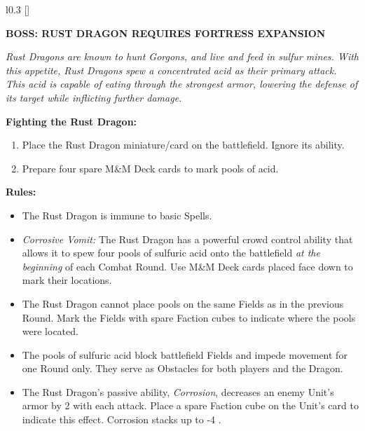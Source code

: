 \begin{wrapfigure}{l}{0.3\textwidth}
  \raisebox{0pt}[\dimexpr{}\baselineskip\relax]{}
\end{wrapfigure}
{
  \textbf{\MakeUppercase{Boss: Rust Dragon {\scriptsize Requires Fortress Expansion}}}

  \medskip

  \textit{Rust Dragons are known to hunt Gorgons, and live and feed in sulfur mines.
    With this appetite, Rust Dragons spew a concentrated acid as their primary attack.
    This acid is capable of eating through the strongest armor, lowering the defense of its target while inflicting further damage.
  }

  \medskip

  \textbf{Fighting the Rust Dragon:}
  \begin{enumerate}
    \item Place the Rust Dragon miniature/card on the battlefield.
      Ignore its ability.
    \item Prepare four spare M\&M Deck cards to mark pools of acid.
  \end{enumerate}

  \medskip

  \textbf{Rules:}
  \begin{itemize}
    \item The Rust Dragon is immune to basic Spells.
    \item \textit{Corrosive Vomit:} The Rust Dragon has a powerful crowd control ability that allows it to spew four pools of sulfuric acid onto the battlefield \textit{at the beginning} of each Combat Round.
      Use M\&M Deck cards placed face down to mark their locations.
    \item The Rust Dragon cannot place pools on the same Fields as in the previous Round.
      Mark the Fields with spare Faction cubes to indicate where the pools were located.
    \item The pools of sulfuric acid block battlefield Fields and impede movement for one Round only.
      They serve as Obstacles for both players and the Dragon.
    \item The Rust Dragon's passive ability, \textit{Corrosion}, decreases an enemy Unit's armor by 2 with each attack.
      Place a spare Faction cube on the Unit's card to indicate this effect.
      Corrosion stacks up to -4 .
  \end{itemize}
}

